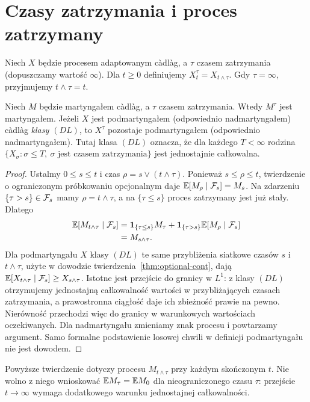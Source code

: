 \section{Czasy zatrzymania i proces zatrzymany}
\begin{definicja}
Niech $X$ będzie procesem adaptowanym c\`adl\`ag,
a $\tau$ czasem zatrzymania (dopuszczamy wartość $\infty$).
Dla $t\ge0$ definiujemy $X_t^\tau=X_{t\wedge\tau}$.
Gdy $\tau=\infty$, przyjmujemy $t\wedge\tau=t$.
\end{definicja}

\begin{twierdzenie}
Niech $M$ będzie martyngałem c\`adl\`ag, a $\tau$
czasem zatrzymania. Wtedy $M^\tau$ jest martyngałem.
Jeżeli $X$ jest podmartyngałem (odpowiednio nadmartyngałem)
c\`adl\`ag \emph{klasy $(DL)$}, to $X^\tau$ pozostaje
podmartyngałem (odpowiednio nadmartyngałem).
Tutaj klasa $(DL)$ oznacza, że dla każdego $T<\infty$
rodzina $\{X_\sigma: \sigma\le T,\ \sigma
\text{ jest czasem zatrzymania}\}$ jest jednostajnie
całkowalna.
\end{twierdzenie}
\begin{proof}
Ustalmy $0\le s\le t$ i czas
$\rho=s\vee(t\wedge\tau)$. Ponieważ
$s\le\rho\le t$, twierdzenie o ograniczonym
próbkowaniu opcjonalnym daje
$\mathbb{E}[M_\rho\mid\mathcal{F}_s]=M_s$.
Na zdarzeniu $\{\tau>s\}\in\mathcal{F}_s$ mamy
$\rho=t\wedge\tau$, a na $\{\tau\le s\}$
proces zatrzymany jest już stały. Dlatego
\[
\begin{aligned}
\mathbb{E}[M_{t\wedge\tau}\mid\mathcal{F}_s]
&=\mathbf{1}_{\{\tau\le s\}}M_\tau
 +\mathbf{1}_{\{\tau>s\}}\mathbb{E}[M_\rho\mid\mathcal{F}_s]\\
&=M_{s\wedge\tau}.
\end{aligned}
\]
Dla podmartyngału $X$ klasy $(DL)$ te same przybliżenia
siatkowe czasów $s$ i $t\wedge\tau$, użyte w dowodzie
twierdzenia~\ref{thm:optional-cont}, dają
$\mathbb{E}[X_{t\wedge\tau}\mid\mathcal{F}_s]\ge X_{s\wedge\tau}$.
Istotne jest przejście do granicy w $L^1$:
z klasy $(DL)$ otrzymujemy jednostajną całkowalność
wartości w przybliżających czasach zatrzymania,
a prawostronna ciągłość daje ich zbieżność prawie na pewno.
Nierówność przechodzi więc do granicy w warunkowych
wartościach oczekiwanych. Dla nadmartyngału zmieniamy
znak procesu i powtarzamy argument. Samo formalne
podstawienie losowej chwili w definicji podmartyngału
nie jest dowodem.
\end{proof}

\begin{uwaga}
Powyższe twierdzenie dotyczy procesu $M_{t\wedge\tau}$
przy każdym skończonym $t$. Nie wolno z niego wnioskować
$\mathbb{E} M_\tau=\mathbb{E} M_0$ dla nieograniczonego czasu $\tau$:
przejście $t\to\infty$ wymaga dodatkowego warunku
jednostajnej całkowalności.
\end{uwaga}

